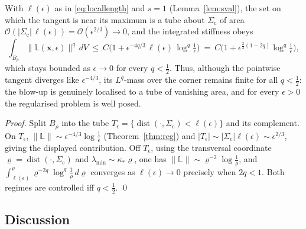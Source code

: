 \begin{proposition}
    \label{prop:narrow}
    With $\ell(\epsilon)$ as in \eqref{eq:locallength} and $s=1$ (Lemma~\ref{lem:sval}), the set on which the tangent is
    near its maximum is a tube about $\Sigma_{\mathrm{c}}$ of area $\mathcal{O}(|\Sigma_{\mathrm{c}}|\,\ell(\epsilon))=\mathcal{O}(\epsilon^{2/3})\to0$,
    and the integrated stiffness obeys
    \begin{equation}
        \int_{B_\rho} \|\mathbb{L}(\bm{x},\epsilon)\|^{q}\,dV
        \ \le\ C\Big(1 + \epsilon^{-4q/3}\,\ell(\epsilon)\,\log^q\tfrac1\epsilon\Big)
        \ =\ C\Big(1 + \epsilon^{\frac{2}{3}\left(1-2q\right)}\log^q\tfrac1\epsilon\Big),
    \end{equation}
    which stays bounded as $\epsilon\to0$ for every $q<\tfrac12$. Thus, although the pointwise tangent diverges like
    $\epsilon^{-4/3}$, its $L^q$-mass over the corner remains finite for all $q<\tfrac12$: the blow-up is genuinely
    localised to a tube of vanishing area, and for every $\epsilon>0$ the regularised problem is well posed.
\end{proposition}

\begin{proof}
    Split $B_\rho$ into the tube $T_\epsilon=\{\operatorname{dist}(\cdot,\Sigma_{\mathrm{c}})<\ell(\epsilon)\}$ and its complement.
    On $T_\epsilon$, $\|\mathbb{L}\|\sim\epsilon^{-4/3}\log\tfrac1\epsilon$ (Theorem~\ref{thm:reg}) and
    $|T_\epsilon|\sim|\Sigma_{\mathrm{c}}|\ell(\epsilon)\sim\epsilon^{2/3}$, giving the displayed contribution. Off $T_\epsilon$,
    using the transversal coordinate $\varrho=\operatorname{dist}(\cdot,\Sigma_{\mathrm{c}})$ and $\lambda_{\min}\sim\kappa_* \varrho$, one has
    $\|\mathbb{L}\|\sim \varrho^{-2}\log\tfrac1\varrho$, and $\int_{\ell(\epsilon)}^{\rho} \varrho^{-2q}\log^q\tfrac1\varrho\,d\varrho$ converges as
    $\ell(\epsilon)\to0$ precisely when $2q<1$. Both regimes are controlled iff $q<\tfrac12$. \qed
\end{proof}

\subsection{Discussion}

